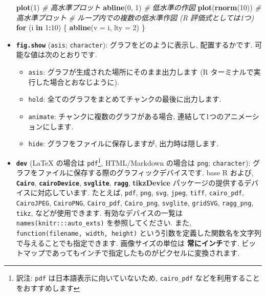\documentclass[
  lualatex,ja=standard,jafont=noto-otf]{bxjsreport}
\newenvironment{Shaded}{\begin{snugshade}}{\end{snugshade}}
\newcommand{\AttributeTok}[1]{\textcolor[rgb]{0.13,0.29,0.53}{#1}}
\newcommand{\CommentTok}[1]{\textcolor[rgb]{0.56,0.35,0.01}{\textit{#1}}}
\newcommand{\ControlFlowTok}[1]{\textcolor[rgb]{0.13,0.29,0.53}{\textbf{#1}}}
\newcommand{\DecValTok}[1]{\textcolor[rgb]{0.00,0.00,0.81}{#1}}
\newcommand{\FunctionTok}[1]{\textcolor[rgb]{0.13,0.29,0.53}{\textbf{#1}}}
\newcommand{\NormalTok}[1]{#1}
\newcommand{\SpecialCharTok}[1]{\textcolor[rgb]{0.81,0.36,0.00}{\textbf{#1}}}
\providecommand{\tightlist}{%
  \setlength{\itemsep}{0pt}\setlength{\parskip}{0pt}}
\begin{document}
\begin{itemize}
\begin{Shaded}
\begin{Highlighting}[numbers=left,,]
\FunctionTok{plot}\NormalTok{(}\DecValTok{1}\NormalTok{) }\CommentTok{\# 高水準プロット}
\FunctionTok{abline}\NormalTok{(}\DecValTok{0}\NormalTok{, }\DecValTok{1}\NormalTok{) }\CommentTok{\# 低水準の作図}
\FunctionTok{plot}\NormalTok{(}\FunctionTok{rnorm}\NormalTok{(}\DecValTok{10}\NormalTok{)) }\CommentTok{\# 高水準プロット}
\CommentTok{\# ループ内での複数の低水準作図 (R 評価式としては1つ)}
\ControlFlowTok{for}\NormalTok{ (i }\ControlFlowTok{in} \DecValTok{1}\SpecialCharTok{:}\DecValTok{10}\NormalTok{) \{}
  \FunctionTok{abline}\NormalTok{(}\AttributeTok{v =}\NormalTok{ i, }\AttributeTok{lty =} \DecValTok{2}\NormalTok{)}
\NormalTok{\}}
\end{Highlighting}
\end{Shaded}
\item
  \textbf{\texttt{fig.show}}
  (\texttt{\textquotesingle{}asis\textquotesingle{}};
  \texttt{character}): グラフをどのように表示し, 配置するかです.
  可能な値は次のとおりです.

  \begin{itemize}
  \tightlist
  \item
    \texttt{asis}: グラフが生成された場所にそのまま出力します (R
    ターミナルで実行した場合とおなじように).
  \item
    \texttt{hold}: 全てのグラフをまとめてチャンクの最後に出力します.
  \item
    \texttt{animate}: チャンクに複数のグラフがある場合,
    連結して1つのアニメーションにします.
  \item
    \texttt{hide}: グラフをファイルに保存しますが, 出力時は隠します.
  \end{itemize}
\item
  \textbf{\texttt{dev}} (LaTeX の場合は
  \texttt{\textquotesingle{}pdf\textquotesingle{}}\footnote{訳注:
    \texttt{pdf} は日本語表示に向いていないため, \texttt{cairo\_pdf}
    などを利用することをおすすめします}, HTML/Markdown の場合は
  \texttt{\textquotesingle{}png\textquotesingle{}}; \texttt{character}):
  グラフをファイルに保存する際のグラフィックデバイスです. base R および,
  \textbf{\texttt{Cairo}}, \textbf{\texttt{cairoDevice}},
  \textbf{\texttt{svglite}}, \textbf{\texttt{ragg}}, \textbf{tikzDevice}
  パッケージの提供するデバイスに対応しています. たとえば, \texttt{pdf},
  \texttt{png}, \texttt{svg}, \texttt{jpeg}, \texttt{tiff},
  \texttt{cairo\_pdf}, \texttt{CairoJPEG}, \texttt{CairoPNG},
  \texttt{Cairo\_pdf}, \texttt{Cairo\_png}, \texttt{svglite},
  \texttt{gridSVG}, \texttt{ragg\_png}, \texttt{tikz},
  などが使用できます. 有効なデバイスの一覧は
  \texttt{names(knitr:::auto\_exts)} を参照してください. また,
  \texttt{function(filename,\ width,\ height)}
  という引数を定義した関数名を文字列で与えることでも指定できます.
  画像サイズの単位は \textbf{常にインチ}です.
  ビットマップであってもインチで指定したものがピクセルに変換されます.
\end{itemize}
\end{document}
